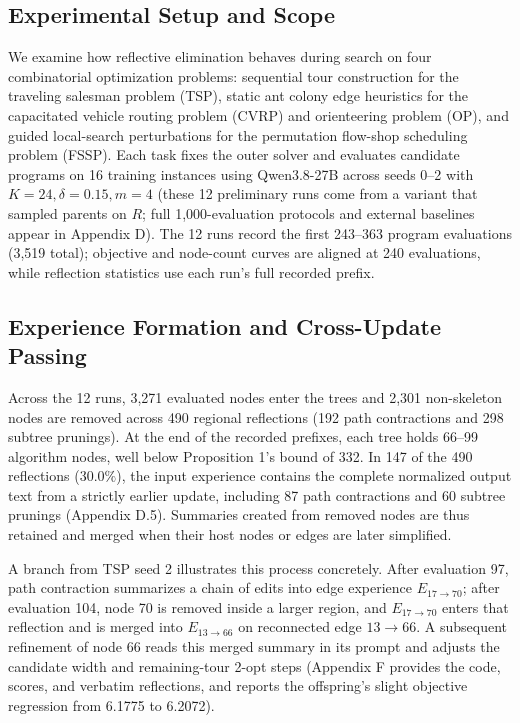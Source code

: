 \documentclass{article}
\begin{document}
\subsection{Experimental Setup and Scope}\label{experimental-setup-and-scope}

We examine how reflective elimination behaves during search on four combinatorial optimization problems: sequential tour construction for the traveling salesman problem (TSP), static ant colony edge heuristics for the capacitated vehicle routing problem (CVRP) and orienteering problem (OP), and guided local-search perturbations for the permutation flow-shop scheduling problem (FSSP). Each task fixes the outer solver and evaluates candidate programs on 16 training instances using Qwen3.8-27B across seeds 0--2 with \(K=24,\delta=0.15,m=4\) (these 12 preliminary runs come from a variant that sampled parents on \(R\); full 1,000-evaluation protocols and external baselines appear in Appendix D). The 12 runs record the first 243--363 program evaluations (3,519 total); objective and node-count curves are aligned at 240 evaluations, while reflection statistics use each run's full recorded prefix.

\subsection{Experience Formation and Cross-Update Passing}\label{experience-formation-and-cross-update-passing}

Across the 12 runs, 3,271 evaluated nodes enter the trees and 2,301 non-skeleton nodes are removed across 490 regional reflections (192 path contractions and 298 subtree prunings). At the end of the recorded prefixes, each tree holds 66--99 algorithm nodes, well below Proposition 1's bound of 332. In 147 of the 490 reflections (\(30.0\%\)), the input experience contains the complete normalized output text from a strictly earlier update, including 87 path contractions and 60 subtree prunings (Appendix D.5). Summaries created from removed nodes are thus retained and merged when their host nodes or edges are later simplified.

A branch from TSP seed 2 illustrates this process concretely. After evaluation 97, path contraction summarizes a chain of edits into edge experience \(E_{17\to70}\); after evaluation 104, node 70 is removed inside a larger region, and \(E_{17\to70}\) enters that reflection and is merged into \(E_{13\to66}\) on reconnected edge \(13\to66\). A subsequent refinement of node 66 reads this merged summary in its prompt and adjusts the candidate width and remaining-tour 2-opt steps (Appendix F provides the code, scores, and verbatim reflections, and reports the offspring's slight objective regression from 6.1775 to 6.2072).
\end{document}
